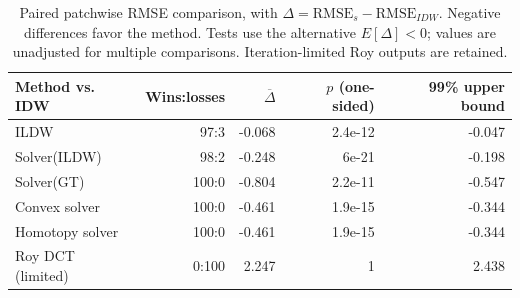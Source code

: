 \begin{table}[H]
\centering\small
\begin{tabular}{lrrrr}
\toprule
Method vs. IDW & Wins:losses & $\overline{\Delta}$ & $p$ (one-sided) & 99\% upper bound \\
\midrule
ILDW & 97:3 & -0.068 & 2.4e-12 & -0.047 \\
Solver(ILDW) & 98:2 & -0.248 & 6e-21 & -0.198 \\
Solver(GT) & 100:0 & -0.804 & 2.2e-11 & -0.547 \\
Convex solver & 100:0 & -0.461 & 1.9e-15 & -0.344 \\
Homotopy solver & 100:0 & -0.461 & 1.9e-15 & -0.344 \\
Roy DCT (limited) & 0:100 & 2.247 & 1 & 2.438 \\
\bottomrule
\end{tabular}
\caption{Paired patchwise RMSE comparison, with $\Delta=\mathrm{RMSE}_{s}-\mathrm{RMSE}_{IDW}$. Negative differences favor the method. Tests use the alternative $E[\Delta]<0$; values are unadjusted for multiple comparisons. Iteration-limited Roy outputs are retained.}
\label{tab:paired-rmse-t-test}
\end{table}
